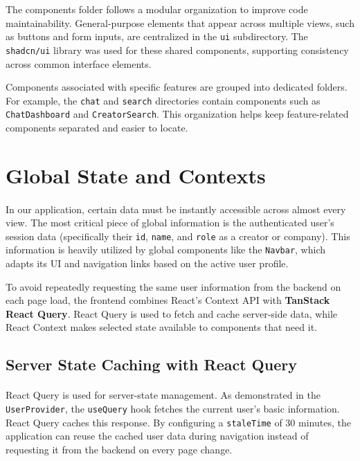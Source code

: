 The components folder follows a modular organization to improve code maintainability. General-purpose elements that appear across multiple views, such as buttons and form inputs, are centralized in the \texttt{ui} subdirectory. The \texttt{shadcn/ui} library was used for these shared components, supporting consistency across common interface elements.

Components associated with specific features are grouped into dedicated folders. For example, the \texttt{chat} and \texttt{search} directories contain components such as \texttt{ChatDashboard} and \texttt{CreatorSearch}. This organization helps keep feature-related components separated and easier to locate.
\section{Global State and Contexts} \label{sec:contexts_web}

\paragraph{}In our application, certain data must be instantly accessible across almost every view. The most critical piece of global information is the authenticated user's session data (specifically their \texttt{id}, \texttt{name}, and \texttt{role} as a creator or company). This information is heavily utilized by global components like the \texttt{Navbar}, which adapts its UI and navigation links based on the active user profile.

To avoid repeatedly requesting the same user information from the backend on each page load, the frontend combines React’s Context API with \textbf{TanStack React Query}. React Query is used to fetch and cache server-side data, while React Context makes selected state available to components that need it.

\subsection{Server State Caching with React Query}
\paragraph{}React Query is used for server-state management. As demonstrated in the \texttt{UserProvider}, the \texttt{useQuery} hook fetches the current user's basic information. React Query caches this response. By configuring a \texttt{staleTime} of 30 minutes, the application can reuse the cached user data during navigation instead of requesting it from the backend on every page change.

